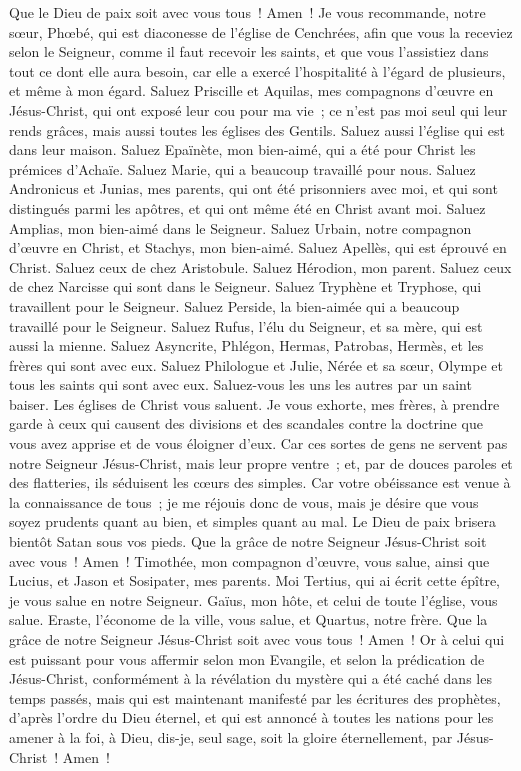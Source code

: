 \begin{multicols}{2}
Que le Dieu de paix soit avec vous tous~! Amen~!
\VerseOne{}Je vous recommande, notre sœur, Phœbé, qui est diaconesse de l'église de Cenchrées,
afin que vous la receviez selon le Seigneur, comme il faut recevoir les saints, et que vous l'assistiez dans tout ce dont elle aura besoin, car elle a exercé l'hospitalité à l'égard de plusieurs, et même à mon égard.
Saluez Priscille et Aquilas, mes compagnons d'œuvre en Jésus-Christ,
qui ont exposé leur cou pour ma vie~; ce n'est pas moi seul qui leur rends grâces, mais aussi toutes les églises des Gentils.
Saluez aussi l'église qui est dans leur maison. Saluez Epaïnète, mon bien-aimé, qui a été pour Christ les prémices d'Achaïe.
Saluez Marie, qui a beaucoup travaillé pour nous.
Saluez Andronicus et Junias, mes parents, qui ont été prisonniers avec moi, et qui sont distingués parmi les apôtres, et qui ont même été en Christ avant moi.
Saluez Amplias, mon bien-aimé dans le Seigneur.
Saluez Urbain, notre compagnon d'œuvre en Christ, et Stachys, mon bien-aimé.
Saluez Apellès, qui est éprouvé en Christ. Saluez ceux de chez Aristobule.
Saluez Hérodion, mon parent. Saluez ceux de chez Narcisse qui sont dans le Seigneur.
Saluez Tryphène et Tryphose, qui travaillent pour le Seigneur. Saluez Perside, la bien-aimée qui a beaucoup travaillé pour le Seigneur.
Saluez Rufus, l'élu du Seigneur, et sa mère, qui est aussi la mienne.
Saluez Asyncrite, Phlégon, Hermas, Patrobas, Hermès, et les frères qui sont avec eux.
Saluez Philologue et Julie, Nérée et sa sœur, Olympe et tous les saints qui sont avec eux.
Saluez-vous les uns les autres par un saint baiser. Les églises de Christ vous saluent.
Je vous exhorte, mes frères, à prendre garde à ceux qui causent des divisions et des scandales contre la doctrine que vous avez apprise et de vous éloigner d'eux.
Car ces sortes de gens ne servent pas notre Seigneur Jésus-Christ, mais leur propre ventre~; et, par de douces paroles et des flatteries, ils séduisent les cœurs des simples.
Car votre obéissance est venue à la connaissance de tous~; je me réjouis donc de vous, mais je désire que vous soyez prudents quant au bien, et simples quant au mal.
Le Dieu de paix brisera bientôt Satan sous vos pieds. Que la grâce de notre Seigneur Jésus-Christ soit avec vous~! Amen~!
Timothée, mon compagnon d'œuvre, vous salue, ainsi que Lucius, et Jason et Sosipater, mes parents.
Moi Tertius, qui ai écrit cette épître, je vous salue en notre Seigneur.
Gaïus, mon hôte, et celui de toute l'église, vous salue. Eraste, l'économe de la ville, vous salue, et Quartus, notre frère.
Que la grâce de notre Seigneur Jésus-Christ soit avec vous tous~! Amen~!
Or à celui qui est puissant pour vous affermir selon mon Evangile, et selon la prédication de Jésus-Christ, conformément à la révélation du mystère qui a été caché dans les temps passés,
mais qui est maintenant manifesté par les écritures des prophètes, d'après l'ordre du Dieu éternel, et qui est annoncé à toutes les nations pour les amener à la foi,
à Dieu, dis-je, seul sage, soit la gloire éternellement, par Jésus-Christ~! Amen~!
\PPE{}
\end{multicols}
